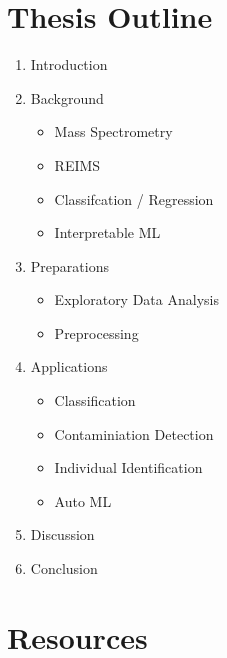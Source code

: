 \documentclass{article}
\begin{document}
\section{Thesis Outline}
\label{sec:outline}

\begin{enumerate}
  \item Introduction 
  \item Background 
  \begin{itemize}
    \item Mass Spectrometry 
    \item REIMS 
    \item Classifcation / Regression 
    \item Interpretable ML
  \end{itemize}
  \item Preparations
  \begin{itemize}
    \item Exploratory Data Analysis 
    \item Preprocessing 
  \end{itemize}
  \item Applications 
  \begin{itemize}
    \item Classification 
    \item Contaminiation Detection 
    \item Individual Identification 
    \item Auto ML  
  \end{itemize} 
  \item Discussion 
  \item Conclusion
\end{enumerate}

\section{Resources}
\label{sec:resources}
\end{document}
